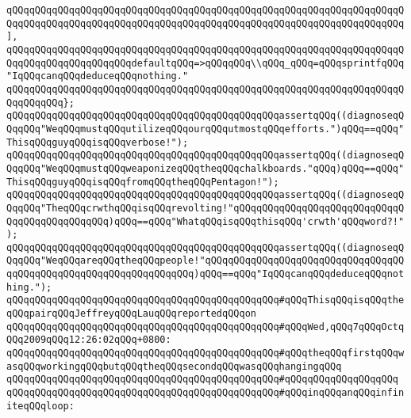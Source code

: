 \verb|qQQqqQQqqQQqqQQqqQQqqQQqqQQqqQQqqQQqqQQqqQQqqQQqqQQqqQQqqQQqqQQqqQQqqQQqqQQqqQQqqQQqqQQqqQQqqQQqqQQqqQQqqQQqqQQqqQQqqQQqqQQqqQQqqQQqqQQqqQQq],|\newline
\newline
\verb|qQQqqQQqqQQqqQQqqQQqqQQqqQQqqQQqqQQqqQQqqQQqqQQqqQQqqQQqqQQqqQQqqQQqqQQqqQQqqQQqqQQqqQQqqQQqdefaultqQQq=>qQQqqQQq\\qQQq_qQQq=qQQqsprintfqQQq"IqQQqcanqQQqdeduceqQQqnothing."|\newline
\verb|qQQqqQQqqQQqqQQqqQQqqQQqqQQqqQQqqQQqqQQqqQQqqQQqqQQqqQQqqQQqqQQqqQQqqQQqqQQqqQQq};|\newline
\newline
\verb|qQQqqQQqqQQqqQQqqQQqqQQqqQQqqQQqqQQqqQQqqQQqqQQqassertqQQq((diagnoseqQQqqQQq"WeqQQqmustqQQqutilizeqQQqourqQQqutmostqQQqefforts.")qQQq==qQQq"ThisqQQqguyqQQqisqQQqverbose!");|\newline
\verb|qQQqqQQqqQQqqQQqqQQqqQQqqQQqqQQqqQQqqQQqqQQqqQQqassertqQQq((diagnoseqQQqqQQq"WeqQQqmustqQQqweaponizeqQQqtheqQQqchalkboards."qQQq)qQQq==qQQq"ThisqQQqguyqQQqisqQQqfromqQQqtheqQQqPentagon!");|\newline
\verb|qQQqqQQqqQQqqQQqqQQqqQQqqQQqqQQqqQQqqQQqqQQqqQQqassertqQQq((diagnoseqQQqqQQq"TheqQQqcrwthqQQqisqQQqrevolting!"qQQqqQQqqQQqqQQqqQQqqQQqqQQqqQQqqQQqqQQqqQQqqQQq)qQQq==qQQq"WhatqQQqisqQQqthisqQQq'crwth'qQQqword?!");|\newline
\verb|qQQqqQQqqQQqqQQqqQQqqQQqqQQqqQQqqQQqqQQqqQQqqQQqassertqQQq((diagnoseqQQqqQQq"WeqQQqareqQQqtheqQQqpeople!"qQQqqQQqqQQqqQQqqQQqqQQqqQQqqQQqqQQqqQQqqQQqqQQqqQQqqQQqqQQqqQQqqQQq)qQQq==qQQq"IqQQqcanqQQqdeduceqQQqnothing.");|\newline
\newline
\verb|qQQqqQQqqQQqqQQqqQQqqQQqqQQqqQQqqQQqqQQqqQQqqQQq#qQQqThisqQQqisqQQqtheqQQqpairqQQqJeffreyqQQqLauqQQqreportedqQQqon|\newline
\verb|qQQqqQQqqQQqqQQqqQQqqQQqqQQqqQQqqQQqqQQqqQQqqQQq#qQQqWed,qQQq7qQQqOctqQQq2009qQQq12:26:02qQQq+0800:|\newline
\verb|qQQqqQQqqQQqqQQqqQQqqQQqqQQqqQQqqQQqqQQqqQQqqQQq#qQQqtheqQQqfirstqQQqwasqQQqworkingqQQqbutqQQqtheqQQqsecondqQQqwasqQQqhangingqQQq|\newline
\verb|qQQqqQQqqQQqqQQqqQQqqQQqqQQqqQQqqQQqqQQqqQQqqQQq#qQQqqQQqqQQqqQQqqQQq|\newline
\verb|qQQqqQQqqQQqqQQqqQQqqQQqqQQqqQQqqQQqqQQqqQQqqQQq#qQQqinqQQqanqQQqinfiniteqQQqloop:|\newline
